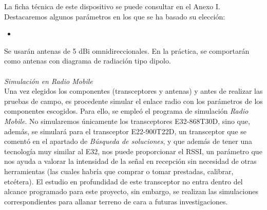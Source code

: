 \documentclass[12pt]{article}
\begin{document}
	\noindent La ficha técnica de este dispositivo se puede consultar en el Anexo I. Destacaremos algunos parámetros en los que se ha basado su elección: \\
	
	\begin{itemize}
		\item 
	\end{itemize}
	
	\noindent Se usarán antenas de 5 dBi omnidireccionales. En la práctica, se comportarán como antenas con diagrama de radiación tipo dipolo.\\
	
	 \\
	
	\noindent \textit{Simulación en Radio Mobile}\\
	
	\noindent Una vez elegidos los componentes (transceptores y antenas) y antes de realizar las pruebas de campo, es procedente simular el enlace radio con los parámetros de los componentes escogidos. Para ello, se empleó el programa de simulación \textit{Radio Mobile}. No simularemos únicamente los transceptores E32-868T30D, sino que, además, se simulará para el transceptor E22-900T22D, un transceptor que se comentó en el apartado de \textit{Búsqueda de soluciones}, y que además de tener una tecnología muy similar al E32, nos puede proporcionar el RSSI, un parámetro que nos ayuda a valorar la intensidad de la señal en recepción sin necesidad de otras herramientas (las cuales habría que comprar o tomar prestadas, calibrar, etcétera). El estudio en profundidad de este transceptor no entra dentro del alcance programado para este proyecto, sin embargo, se realizan las simulaciones correspondientes para allanar terreno de cara a futuras investigaciones.\\
	
\end{document}
